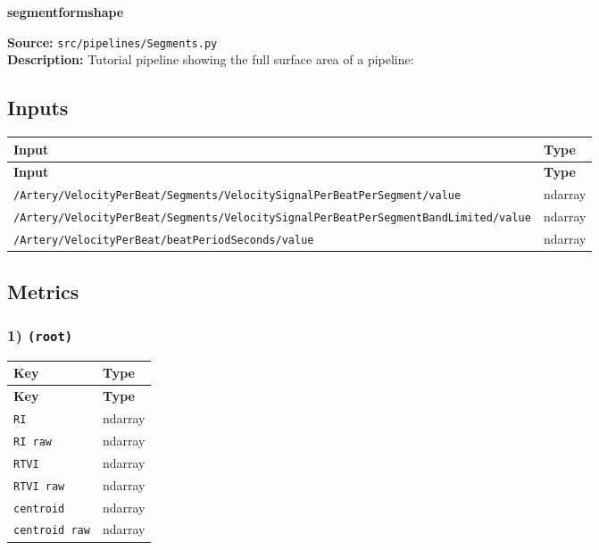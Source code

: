 \documentclass[11pt]{article}
\begin{document}
\begin{center}
\LARGE\textbf{segmentformshape}
\end{center}
\textbf{Source:} \texttt{src/\allowbreak{}pipelines/\allowbreak{}Segments.py}\\
\textbf{Description:} Tutorial pipeline showing the full surface area of a pipeline:

\subsection*{Inputs}
\begin{longtable}{|p{}|p{}|}
\hline
\textbf{Input} & \textbf{Type} \\ \hline
\endfirsthead
\hline
\textbf{Input} & \textbf{Type} \\ \hline
\endhead
{\scriptsize \texttt{/\allowbreak{}Artery/\allowbreak{}VelocityPerBeat/\allowbreak{}Segments/\allowbreak{}VelocitySignalPerBeatPerSegment/\allowbreak{}value}} & ndarray \\ \hline
{\scriptsize \texttt{/\allowbreak{}Artery/\allowbreak{}VelocityPerBeat/\allowbreak{}Segments/\allowbreak{}VelocitySignalPerBeatPerSegmentBandLimited/\allowbreak{}value}} & ndarray \\ \hline
{\scriptsize \texttt{/\allowbreak{}Artery/\allowbreak{}VelocityPerBeat/\allowbreak{}beatPeriodSeconds/\allowbreak{}value}} & ndarray \\ \hline
\end{longtable}

\subsection*{Metrics}
\subsubsection*{1) \texttt{(root)}}
\begin{longtable}{|p{}|p{}|}
\hline
\textbf{Key} & \textbf{Type} \\ \hline
\endfirsthead
\hline
\textbf{Key} & \textbf{Type} \\ \hline
\endhead
\texttt{RI} & ndarray \\ \hline
\texttt{RI raw} & ndarray \\ \hline
\texttt{RTVI} & ndarray \\ \hline
\texttt{RTVI raw} & ndarray \\ \hline
\texttt{centroid} & ndarray \\ \hline
\texttt{centroid raw} & ndarray \\ \hline
\end{longtable}
\end{document}
